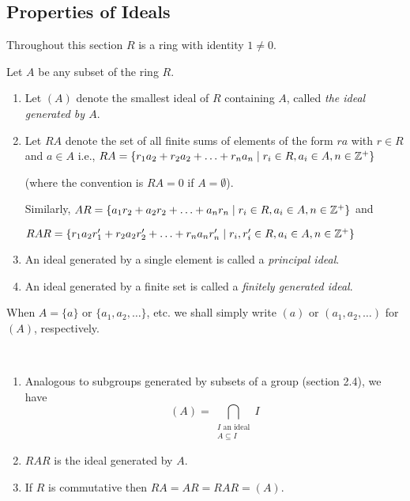 \documentclass[../main]{subfiles}
\begin{document}
\subsection{Properties of Ideals}

Throughout this section $R$ is a ring with identity $1 \neq 0$.


\begin{dfn}
 Let $A$ be any subset of the ring $R$.
 \begin{enumerate}
  \item Let $(A)$ denote the smallest ideal of $R$ containing $A$, called \textit{the ideal generated by $A$}.
  
  \item Let $RA$ denote the set of all finite sums of elements of the form $ra$ with $r \in R$ and $a\in A$ i.e., $RA = \{ r_1 a_2 + r_2 a_2 + \ldots + r_n a_n \mid r_i \in R, a_i \in A, n \in \mathbb{Z}^+ \}$ 
  
  (where the convention is $RA = 0$ if $A = \emptyset$). 
  
  Similarly, $AR = \{ a_1 r_2 + a_2 r_2 + \ldots + a_n r_n \mid r_i \in R, a_i \in A, n \in \mathbb{Z}^+ \}$ and 
  
  $RAR = \{ r_1 a_2 r_1' + r_2 a_2 r_2' + \ldots + r_n a_n r_n' \mid r_i, r_i' \in R, a_i \in A, n \in \mathbb{Z}^+ \}$
  
  \item An ideal generated by a single element is called a \textit{principal ideal}.
  
  \item An ideal generated by a finite set is called a \textit{finitely generated ideal}.
 \end{enumerate}
\end{dfn}


\begin{nt}
 When $A = \{a\}$ or $\{a_1,a_2,\ldots\}$, etc. we shall simply write $(a)$ or $(a_1, a_2, \ldots)$ for $(A)$, respectively.
\end{nt}


\begin{nt}
 ~\begin{enumerate}
  \item Analogous to subgroups generated by subsets of a group (section 2.4), we have 
  \[ (A) = \bigcap_{\substack{I \text{ an ideal} \\ A \subseteq I}} I \]
  
  \item $RAR$ is the ideal generated by $A$.
  
  \item If $R$ is commutative then $RA = AR = RAR = (A)$.
 \end{enumerate}
\end{nt}
\end{document}
